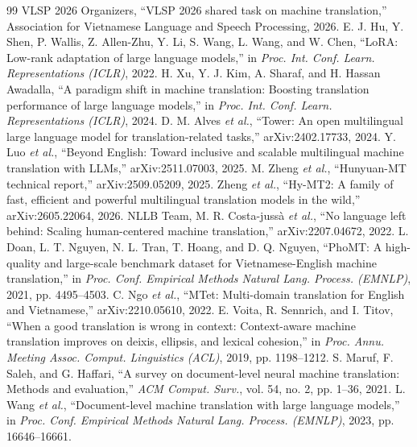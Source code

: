 \documentclass[conference]{IEEEtran}
\begin{document}
\begin{thebibliography}{99}
 VLSP 2026 Organizers, ``VLSP 2026 shared task on machine translation,'' Association for Vietnamese Language and Speech Processing, 2026. %
 E. J. Hu, Y. Shen, P. Wallis, Z. Allen-Zhu, Y. Li, S. Wang, L. Wang, and W. Chen, ``LoRA: Low-rank adaptation of large language models,'' in \emph{Proc. Int. Conf. Learn. Representations (ICLR)}, 2022.
 H. Xu, Y. J. Kim, A. Sharaf, and H. Hassan Awadalla, ``A paradigm shift in machine translation: Boosting translation performance of large language models,'' in \emph{Proc. Int. Conf. Learn. Representations (ICLR)}, 2024.
 D. M. Alves \emph{et al.}, ``Tower: An open multilingual large language model for translation-related tasks,'' arXiv:2402.17733, 2024.
 Y. Luo \emph{et al.}, ``Beyond English: Toward inclusive and scalable multilingual machine translation with LLMs,'' arXiv:2511.07003, 2025. %
 M. Zheng \emph{et al.}, ``Hunyuan-MT technical report,'' arXiv:2509.05209, 2025.
 Zheng \emph{et al.}, ``Hy-MT2: A family of fast, efficient and powerful multilingual translation models in the wild,'' arXiv:2605.22064, 2026. %
 NLLB Team, M. R. Costa-juss\`{a} \emph{et al.}, ``No language left behind: Scaling human-centered machine translation,'' arXiv:2207.04672, 2022.
 L. Doan, L. T. Nguyen, N. L. Tran, T. Hoang, and D. Q. Nguyen, ``PhoMT: A high-quality and large-scale benchmark dataset for Vietnamese-English machine translation,'' in \emph{Proc. Conf. Empirical Methods Natural Lang. Process. (EMNLP)}, 2021, pp. 4495--4503.
 C. Ngo \emph{et al.}, ``MTet: Multi-domain translation for English and Vietnamese,'' arXiv:2210.05610, 2022.
 E. Voita, R. Sennrich, and I. Titov, ``When a good translation is wrong in context: Context-aware machine translation improves on deixis, ellipsis, and lexical cohesion,'' in \emph{Proc. Annu. Meeting Assoc. Comput. Linguistics (ACL)}, 2019, pp. 1198--1212.
 S. Maruf, F. Saleh, and G. Haffari, ``A survey on document-level neural machine translation: Methods and evaluation,'' \emph{ACM Comput. Surv.}, vol. 54, no. 2, pp. 1--36, 2021.
 L. Wang \emph{et al.}, ``Document-level machine translation with large language models,'' in \emph{Proc. Conf. Empirical Methods Natural Lang. Process. (EMNLP)}, 2023, pp. 16646--16661.

\end{thebibliography}
\end{document}
